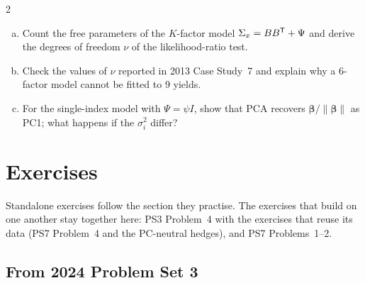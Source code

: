 \begin{paracol}{2}
\begin{exercise}\label{ch07:ex-fa}
\leavevmode
\begin{enumerate}[(a)]
  \item Count the free parameters of the $K$-factor model $\Sigma_x=BB^{\mathsf T}+\Psi$ and derive the degrees of freedom $\nu$ of the
      likelihood-ratio test.
  \item Check the values of $\nu$ reported in 2013 Case Study~7 and explain why a 6-factor model
      cannot be fitted to 9 yields.
  \item For the single-index model with $\Psi=\psi I$, show that PCA recovers $\bm\beta/\|\bm\beta\|$ as
      PC1; what happens if the $\sigma_i^2$ differ?
\end{enumerate}
\end{exercise}

\section*{Exercises}
Standalone exercises follow the section they practise. The exercises that build on one another stay together here: PS3 Problem~4 with the exercises that reuse its data (PS7 Problem~4 and the PC-neutral hedges), and PS7 Problems~1--2.

\subsection*{From 2024 Problem Set 3}


\end{paracol}

